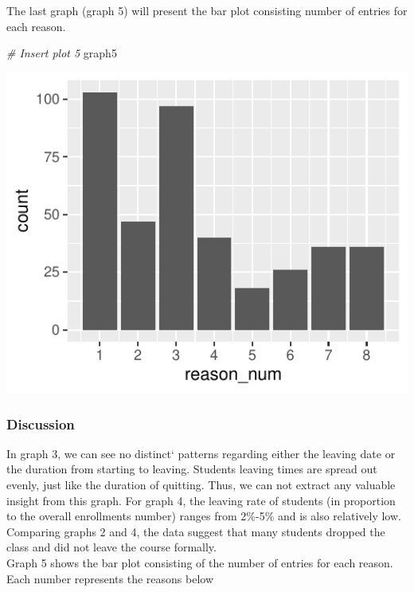 \documentclass[12pt,]{article}
\newenvironment{Shaded}{\begin{snugshade}}{\end{snugshade}}
\newcommand{\CommentTok}[1]{\textcolor[rgb]{0.56,0.35,0.01}{\textit{#1}}}
\newcommand{\NormalTok}[1]{#1}
\begin{document}
The last graph (graph 5) will present the bar plot consisting number of
entries for each reason.

\begin{Shaded}
\begin{Highlighting}[]
\CommentTok{\# Insert plot 5}
\NormalTok{graph5}
\end{Highlighting}
\end{Shaded}

\begin{center}\includegraphics{report_files/figure-latex/unnamed-chunk-22-1} \end{center}

\hypertarget{discussion-1}{%
\subsubsection{Discussion}\label{discussion-1}}

In graph 3, we can see no distinct` patterns regarding either the
leaving date or the duration from starting to leaving. Students leaving
times are spread out evenly, just like the duration of quitting. Thus,
we can not extract any valuable insight from this graph. For graph 4,
the leaving rate of students (in proportion to the overall enrollments
number) ranges from 2\%-5\% and is also relatively low. Comparing graphs
2 and 4, the data suggest that many students dropped the class and did
not leave the course formally.\\
\hfill\break Graph 5 shows the bar plot consisting of the number of
entries for each reason. Each number represents the reasons below
\end{document}
